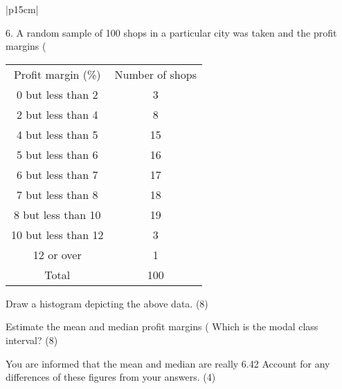\documentclass[a4paper,12pt]{article}
\begin{document}
\begin{table}[ht!]
     

\centering
     

\begin{tabular}{|p{15cm}|}
     

\hline 

 
6. A random sample of 100 shops in a particular city was taken and the profit margins (%
 
\begin{center}
\begin{tabular}{|c|c|}
Profit margin (\%) & Number of shops \\
0 but less than 2   &  3 \\
2 but less than 4   &  8 \\
4 but less than 5   & 15 \\
5 but less than 6   & 16 \\
6 but less than 7   & 17 \\
7 but less than 8   & 18 \\
8 but less than 10   & 19 \\
10 but less than 12    &  3 \\
12 or over     & 1   \\
Total & 100 \\
\end{tabular}
\end{center}
 
 
Draw a histogram depicting the above data. 
(8) 
 
Estimate the mean and median profit margins (%
Which is the modal class interval? (8) 
 
You are informed that the mean and median are really 6.42%
Account for any differences of these figures from your answers. (4) 
\\ \hline


\end{tabular}
    

\end{table}
\end{document}
